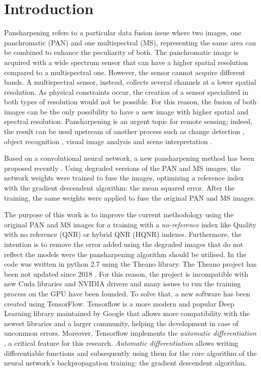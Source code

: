\documentclass[12pt]{report}
\begin{document}
\chapter*{Introduction}
Pansharpening refers to a particular data fusion issue where two images, one panchromatic (PAN) and one multispectral (MS), representing the same area can be combined to enhance the peculiarity of both. The panchromatic image is acquired with a wide spectrum sensor that can have a higher spatial resolution compared to a multispectral one. However, the sensor cannot acquire different bands. A multispectral sensor, instead, collects several channels at a lower spatial resolution. As physical constraints occur, the creation of a sensor specialized in both types of resolution would not be possible. For this reason, the fusion of both images can be the only possibility to have a new image with higher spatial and spectral resolution. Pansharpening is an urgent topic for remote sensing; indeed, the result can be used upstream of another process such as change detection \cite{changedetection}, object recognition \cite{objectrecognition}, visual image analysis and scene interpretation \cite{sceneinterp}.

Based on a convolutional neural network, a new pansharpening method has been proposed recently \cite{pnn}.
Using degraded versions of the PAN and MS images, the network weights were trained to fuse the images, optimizing a reference index with the gradient descendent algorithm: the mean squared error. After the training, the same weights were applied to fuse the original PAN and MS images.

The purpose of this work is to improve the current methodology using the original PAN and MS images for a training with a \textit{no-reference} index like Quality with no reference (QNR) or hybrid QNR (HQNR) indexes. Furthermore, the intention is to remove the error added using the degraded images that do not reflect the models were the pansharpening algorithm should be utilised.
In \cite{pnn} the code was written in python 2.7 using the Theano library. The Theano project has been not updated since 2018 \cite{theanorip}. For this reason, the project is incompatible with new Cuda libraries and NVIDIA drivers and many issues to run the training process on the GPU have been founded. To solve that, a new software has been created using TensorFlow. Tensorflow is a more modern and popular Deep Learning library maintained by Google that allows more compatibility with the newest libraries and a larger community, helping the development in case of uncommon errors. 
Moreover, Tensorflow implements the \emph{automatic differentiation} \cite{tensorflowautoderiv}, a critical feature for this research. \emph{Automatic differentiation} allows writing differentiable functions and subsequently using them for the core algorithm of the neural network's backpropagation training: the gradient descendent algorithm. 
\end{document}
